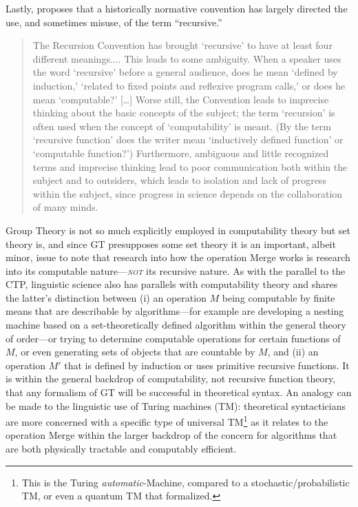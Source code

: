 \documentclass[11pt,twoside]{article}
\begin{document}
Lastly, \cite[29]{soare:1996} proposes that a historically normative convention has largely directed the use, and sometimes misuse, of the term ``recursive.''
	\begin{quotation} 
	The Recursion Convention has brought `recursive' to have at least four different 	meanings.... This leads to some ambiguity. When a speaker uses the word 	`recursive' before a general audience, does he mean `defined by induction,' `related to fixed points and reflexive program calls,' or does he mean 	`computable?' [\ldots] Worse still, the Convention leads to imprecise thinking about 	the basic concepts of the subject; the term `recursion' is often used when the 	concept of `computability' is meant. (By the term `recursive function' does the 	writer mean `inductively defined function' or `computable function?') 	Furthermore, ambiguous and little recognized terms and imprecise thinking lead 	to poor communication both within the subject and to outsiders, which leads to 	isolation and lack of progress within the subject, since progress in science 	depends on the collaboration of many minds.
  \end{quotation}

Group Theory is not so much explicitly employed in computability theory but set theory is, and since GT presupposes some set theory it is an important, albeit minor, issue to note that research into how the operation Merge works is research into its computable nature---\textsl{\textsc{not}} its recursive nature. As with the parallel to the CTP, linguistic science also has parallels with computability theory and shares the latter's distinction between (i) an operation $M$ being computable by finite means that are describable by algorithms---for example \cite{fortcm:toappear} are developing a nesting machine based on a set-theoretically defined algorithm within the general theory of order---or trying to determine computable operations for certain functions of $M$, or even generating sets of objects that are countable by $M$, and (ii) an operation $M'$ that is defined by induction or uses primitive recursive functions. It is within the general backdrop of computability, not recursive function theory, that any formalism of GT will be successful in theoretical syntax. An analogy can be made to the linguistic use of Turing machines (TM): theoretical syntacticians are more concerned with a specific type of universal TM\footnote{This is the Turing \textsl{automatic}-Machine, compared to a stochastic/probabilistic TM, or even a quantum TM that \cite{deutsch:1985} formalized.} as it relates to the operation Merge within the larger backdrop of the concern for algorithms that are both physically tractable and computably efficient.
\end{document}

